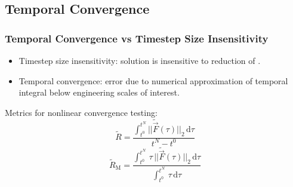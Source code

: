 \documentclass[compress,xcolor=table]{beamer}
\begin{document}
\subsection[Convergence]{Temporal Convergence}
\begin{frame}
\frametitle{Temporal Convergence vs Timestep Size Insensitivity}

\begin{itemize}
\item{Timestep size insensitivity: solution is insensitive to reduction of \dtmax{}.}
\item{Temporal convergence: error due to numerical approximation of temporal integral below engineering scales of interest.}
\end{itemize}

Metrics for nonlinear convergence testing:
\begin{equation*}
\tilde{R} = \frac{\int_{t^{0}}^{t^{N}} ||\tilde{\vec{F}}(\tau)||_2 \,\mathrm{d} \tau}{t^{N} - t^{0}}
\end{equation*}
\begin{equation*}
\tilde{R}_{\text{M}} = \frac{\int_{t^{0}}^{t^{N}} \,\tau\,||\tilde{\vec{F}}(\tau)||_2 \,\mathrm{d} \tau}{\int_{t^{0}}^{t^{N}} \,\tau \,\mathrm{d} \tau}
\end{equation*}

\end{frame}
\end{document}
